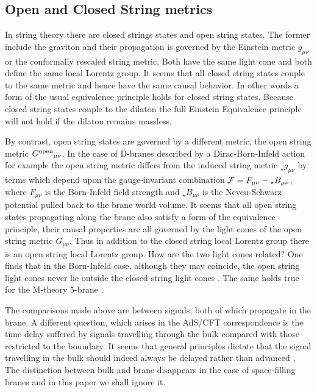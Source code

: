 \documentclass[a4paper,12pt]{article}
\begin{document}
\subsection{Open and Closed String metrics}


In string theory there are closed strings states and open string
states. The former include the graviton and their propagation is
governed by the Einstein metric $g_{\mu \nu}$ or the conformally
rescaled string metric. Both have the same light cone and both
define the same local Lorentz group. It seems that all closed
string states  couple to the same metric and hence have the same
causal behavior. In other words  a form of the usual equivalence
principle holds for closed string states. Because closed string
states  couple to the dilaton the full Einstein Equivalence
principle will not hold if the dilaton remains massless.

By contrast, open string states are governed by a different
metric, the open string metric ${ G^{\rm open}}  _{\mu \nu}$. In
the case of D-branes described by a Dirac-Born-Infeld action for
example the open string metric differs from the induced string
metric $_\star g_{\mu \nu} $  by terms which depend upon the
gauge-invariant combination 
${\cal F} = F_{\mu \nu} - {}_\star B_{\mu \nu}$, 
where $F_{\mu \nu}$ is the Born-Infeld field strength  and
$_\star B_{\mu \nu}$ is the  Neveu-Schwarz potential pulled back
to the brane world volume. It seems that all open string states
propagating along the brane also satisfy a form of the equivalence
principle, their causal properties are all governed by the light
cones of the open string metric $G_{\mu \nu}$. Thus in addition to
the closed string local Lorentz group there is an open string
local Lorentz group. How are the two light cones related? One
finds that in the Born-Infeld case, although they may
coincide, the open string light cones never lie outside the closed
string light cones \cite{Herdeiro, Gibbons2, Gibbons3}. The same
holds true for the M-theory 5-brane \cite{West}.

The comparisons made above are between signals, both of which
propagate in the brane. A different question, which arises in the
AdS/CFT correspondence is the time delay suffered by signals
travelling through the bulk compared with those restricted to the
boundary. It seems that general principles dictate that the signal
travelling in the bulk should indeed always be delayed rather than
advanced \cite{Wald, Page}. The distinction between bulk and brane
disappears in the case of space-filling branes and in this paper
we shall ignore it.
\end{document}
